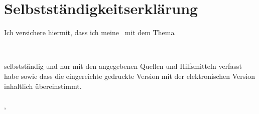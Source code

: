 
\newpage
\section*{Selbstständigkeitserklärung}
Ich versichere hiermit, dass ich meine \mytexttype \ mit dem Thema
\begin{center}
\textbf{{\large \mytitle} \\ \mysubtitle}
\end{center}
selbstständig und nur mit den angegebenen Quellen und Hilfsmitteln verfasst habe sowie dass die eingereichte gedruckte Version mit der elektronischen Version inhaltlich übereinstimmt.\\
\\
\vspace{15mm}
\noindent{}\mysubmissionplace , \mydate
\hfill
\begin{minipage}[t]{6cm}
\centering \dotfill \\
\myauthor
\end{minipage}